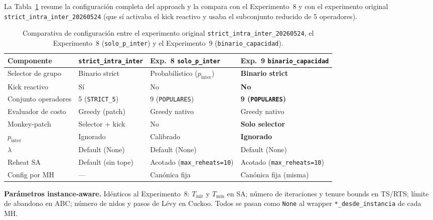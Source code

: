 La Tabla~\ref{tab:config-binario-capacidad} resume la configuración
completa del approach y la compara con el Experimento~8 y con el
experimento original \texttt{strict\_intra\_inter\_20260524} (que sí
activaba el kick reactivo y usaba el subconjunto reducido de 5
operadores).

\begin{table}[h]
\centering
\caption{Comparativa de configuración entre el experimento original
         \texttt{strict\_intra\_inter\_20260524}, el Experimento~8
         (\texttt{solo\_p\_inter}) y el Experimento~9
         (\texttt{binario\_capacidad}).}
\label{tab:config-binario-capacidad}
\small
\begin{tabular}{llll}
\toprule
Componente &
  \texttt{strict\_intra\_inter} &
  Exp.~8 \texttt{solo\_p\_inter} &
  Exp.~9 \texttt{binario\_capacidad} \\
\midrule
Selector de grupo    & Binario strict       & Probabilístico ($p_{\text{inter}}$) & \textbf{Binario strict} \\
Kick reactivo        & Sí                   & No                                  & \textbf{No} \\
Conjunto operadores  & 5 (\texttt{STRICT\_5}) & 9 (\texttt{POPULARES})            & \textbf{9 (\texttt{POPULARES})} \\
Evaluador de costo   & Greedy (patch)       & Greedy nativo                       & Greedy nativo \\
Monkey-patch         & Selector + kick      & No                                  & \textbf{Solo selector} \\
$p_{\text{inter}}$   & Ignorado             & Calibrado                           & \textbf{Ignorado} \\
$\lambda$            & Default (None)       & Default (None)                      & Default (None) \\
Reheat SA            & Default (sin tope)   & Acotado (\texttt{max\_reheats=10})  & Acotado (\texttt{max\_reheats=10}) \\
Config por MH        & ---                  & Canónica fija                       & Canónica fija (misma) \\
\bottomrule
\end{tabular}
\end{table}

\medskip
\noindent\textbf{Parámetros instance-aware.} Idénticos al Experimento~8:
$T_{\text{init}}$ y $T_{\min}$ en SA; número de iteraciones y tenure
bounds en TS/RTS; límite de abandono en ABC; número de nidos y pasos
de Lévy en Cuckoo. Todos se pasan como \texttt{None} al wrapper
\texttt{*\_desde\_instancia} de cada MH.

